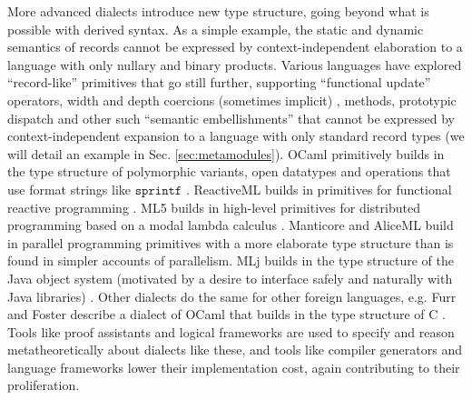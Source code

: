 More advanced dialects introduce new type structure, going beyond what is possible with derived syntax. As a simple example, the static and dynamic semantics of records cannot be expressed by context-independent elaboration to a language with only nullary and binary products. Various  languages have explored ``record-like'' primitives that go still further, supporting ``functional update'' operators, width and depth coercions (sometimes implicit)%
, methods, prototypic dispatch and other such ``semantic embellishments'' that cannot be expressed by context-independent expansion to a language with only standard record types (we will detail an  example in Sec. \ref{sec:metamodules}). OCaml primitively builds in the type structure of polymorphic variants, open datatypes and  operations that use format strings like $\mathtt{sprintf}$ \cite{ocaml-manual}. ReactiveML builds in primitives for functional reactive programming \cite{mandel2005reactiveml}. ML5 builds in high-level primitives for distributed programming based on a modal lambda calculus \cite{Murphy:2007:TDP:1793574.1793585}. Manticore \cite{conf/popl/FluetRRSX07} and AliceML  \cite{AliceLookingGlass} build in parallel programming primitives with a more elaborate type structure than is found in simpler accounts of parallelism. 
MLj builds in the type structure of the Java object system (motivated by a desire to interface safely and naturally with Java libraries) \cite{Benton:1999:IWW:317636.317791}. Other dialects do the same for other foreign languages, e.g. Furr and Foster describe a dialect of OCaml that builds in the type structure of C \cite{Furr:2005:CTS:1065010.1065019}. Tools like proof assistants and logical frameworks are used to specify and reason metatheoretically about dialects like these, and tools like compiler generators and language frameworks \cite{erdweg2013state} lower their implementation cost, again contributing to their proliferation. 


